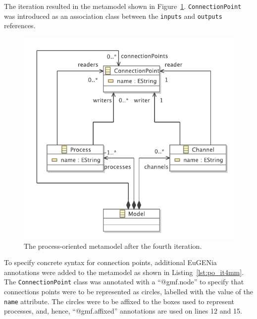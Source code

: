 The iteration resulted in the metamodel shown in Figure~\ref{fig:po_it4_mm}. \texttt{Co\-nn\-ec\-ti\-o\-nP\-oi\-nt} was introduced as an association class between the \texttt{in\-pu\-ts} and \texttt{o\-ut\-pu\-ts} references.

\begin{figure}[htbp]
	\centering
		\includegraphics[scale=0.75]{A.2.ProcessOriented/images/4_mm.pdf}
	\caption{The process-oriented metamodel after the fourth iteration.}
	\label{fig:po_it4_mm}
\end{figure}

To specify concrete syntax for connection points, additional EuGENia annotations were added to the metamodel as shown in Listing~\ref{lst:po_it4mm}. The \texttt{Co\-nn\-ec\-ti\-o\-nP\-oi\-nt} class was annotated with a ``@gmf.node'' to specify that connections points were to be represented as circles, labelled with the value of the \texttt{name} attribute. The circles were to be affixed to the boxes used to represent processes, and, hence, ``@gmf.affixed'' annotations are used on lines 12 and 15.

